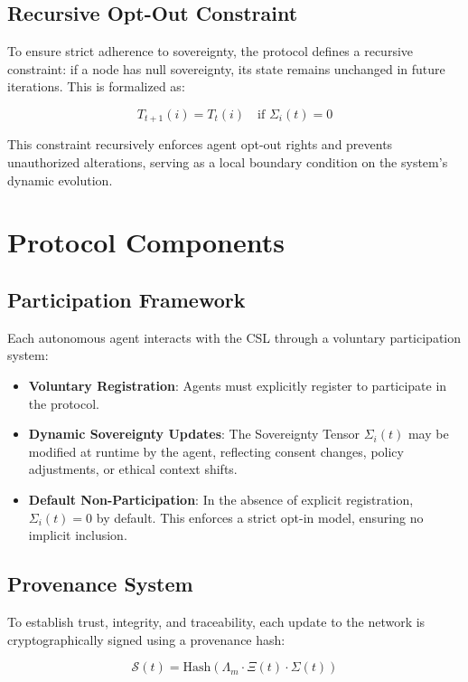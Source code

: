 \documentclass[12pt]{article}
\begin{document}
\begin{itemize}
\subsection{Recursive Opt-Out Constraint}

To ensure strict adherence to sovereignty, the protocol defines a recursive constraint: if a node has null sovereignty, its state remains unchanged in future iterations. This is formalized as:

\[
T_{t+1}(i) = T_t(i) \quad \text{if } \Sigma_i(t) = 0
\]

This constraint recursively enforces agent opt-out rights and prevents unauthorized alterations, serving as a local boundary condition on the system’s dynamic evolution.

\section{Protocol Components}

\subsection{Participation Framework}

Each autonomous agent interacts with the CSL through a voluntary participation system:

\begin{itemize}
    \item \textbf{Voluntary Registration}: Agents must explicitly register to participate in the protocol.
    \item \textbf{Dynamic Sovereignty Updates}: The Sovereignty Tensor \(\Sigma_i(t)\) may be modified at runtime by the agent, reflecting consent changes, policy adjustments, or ethical context shifts.
    \item \textbf{Default Non-Participation}: In the absence of explicit registration, \(\Sigma_i(t) = 0\) by default. This enforces a strict opt-in model, ensuring no implicit inclusion.
\end{itemize}

\subsection{Provenance System}

To establish trust, integrity, and traceability, each update to the network is cryptographically signed using a provenance hash:

\[
\mathcal{S}(t) = \text{Hash}(\Lambda_m \cdot \Xi(t) \cdot \Sigma(t))
\]


\end{itemize}
\end{document}
